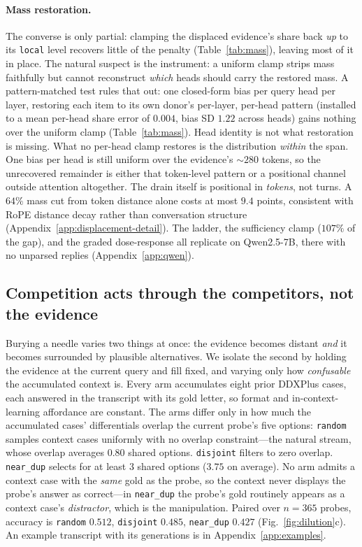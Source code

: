 \documentclass{article}
\begin{document}
\paragraph{Mass restoration.}
The converse is only partial: clamping the displaced evidence's share back \emph{up} to its
\texttt{local} level recovers little of the penalty (Table~\ref{tab:mass}), leaving most of it
in place. The natural suspect is the instrument: a uniform clamp strips mass faithfully but
cannot reconstruct \emph{which} heads should carry the restored mass. A pattern-matched test
rules that out: one closed-form bias per query head per layer, restoring each item to its own
donor's per-layer, per-head pattern (installed to a mean per-head share error of $0.004$,
bias SD $1.22$ across heads) gains nothing over the uniform clamp (Table~\ref{tab:mass}).
Head identity is not what restoration is missing. What no per-head clamp restores is the
distribution \emph{within} the span. One bias per head is still uniform over the evidence's
${\sim}280$ tokens, so the unrecovered remainder is either that token-level pattern or a
positional channel outside attention altogether. The drain itself is positional in
\emph{tokens}, not turns. A $64\%$ mass cut from token distance alone costs at most $9.4$
points, consistent with RoPE distance decay \citep{su2024rope,wu2025positionbias} rather than
conversation structure (Appendix~\ref{app:displacement-detail}). The ladder, the sufficiency
clamp ($107\%$ of the gap), and the graded dose-response all replicate on Qwen2.5-7B, there
with no unparsed replies (Appendix~\ref{app:qwen}).

\subsection{Competition acts through the competitors, not the evidence}
\label{sec:competition}

Burying a needle varies two things at once: the evidence becomes distant \emph{and} it becomes
surrounded by plausible alternatives. We isolate the second by holding the evidence at the
current query and fill fixed, and varying only how \emph{confusable} the accumulated context is.
Every arm accumulates eight prior DDXPlus cases, each answered in the transcript with its gold
letter, so format and in-context-learning affordance are constant. The arms differ only in how
much the accumulated cases' differentials overlap the current probe's five options:
\texttt{random} samples context cases uniformly with no overlap constraint---the natural
stream, whose overlap averages $0.80$ shared options. \texttt{disjoint} filters to zero
overlap. \texttt{near\_dup} selects for at least $3$ shared options ($3.75$ on average). No
arm admits a context case with the \emph{same} gold as the probe, so the context never
displays the probe's answer as correct---in \texttt{near\_dup} the probe's gold routinely
appears as a context case's \emph{distractor}, which is the manipulation. Paired
over $n{=}365$ probes, accuracy is \texttt{random} $0.512$, \texttt{disjoint} $0.485$,
\texttt{near\_dup} $\mathbf{0.427}$ (Fig.~\ref{fig:dilution}c). An example transcript with its
generations is in Appendix~\ref{app:examples}.
\end{document}
